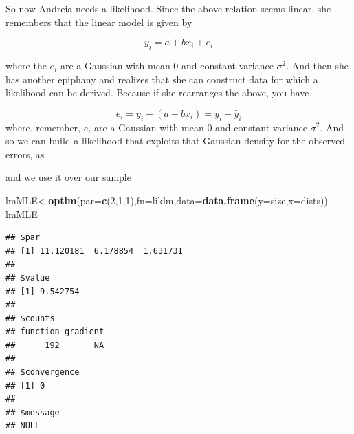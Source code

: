 \documentclass[
]{book}
\newenvironment{Shaded}{\begin{snugshade}}{\end{snugshade}}
\newcommand{\CommentTok}[1]{\textcolor[rgb]{0.56,0.35,0.01}{\textit{#1}}}
\newcommand{\ControlFlowTok}[1]{\textcolor[rgb]{0.13,0.29,0.53}{\textbf{#1}}}
\newcommand{\DataTypeTok}[1]{\textcolor[rgb]{0.13,0.29,0.53}{#1}}
\newcommand{\DecValTok}[1]{\textcolor[rgb]{0.00,0.00,0.81}{#1}}
\newcommand{\KeywordTok}[1]{\textcolor[rgb]{0.13,0.29,0.53}{\textbf{#1}}}
\newcommand{\NormalTok}[1]{#1}
\newcommand{\OperatorTok}[1]{\textcolor[rgb]{0.81,0.36,0.00}{\textbf{#1}}}
\begin{document}
So now Andreia needs a likelihood. Since the above relation seems linear, she remembers that the linear model is given by

\[y_i=a+b x_i+e_i\]

where the \(e_i\) are a Gaussian with mean 0 and constant variance \(\sigma^2\). And then she has another epiphany and realizes that she can construct data for which a likelihood can be derived. Because if she rearranges the above, you have

\[e_i=y_i-(a+b x_i)=y_i-\hat y_i\]
where, remember, \(e_i\) are a Gaussian with mean 0 and constant variance \(\sigma^2\). And so we can build a likelihood that exploits that Gaussian density for the observed errors, as

\begin{Shaded}
\end{Shaded}

and we use it over our sample

\begin{Shaded}
\begin{Highlighting}[]
\NormalTok{lmMLE<-}\KeywordTok{optim}\NormalTok{(}\DataTypeTok{par=}\KeywordTok{c}\NormalTok{(}\DecValTok{2}\NormalTok{,}\DecValTok{1}\NormalTok{,}\DecValTok{1}\NormalTok{),}\DataTypeTok{fn=}\NormalTok{liklm,}\DataTypeTok{data=}\KeywordTok{data.frame}\NormalTok{(}\DataTypeTok{y=}\NormalTok{size,}\DataTypeTok{x=}\NormalTok{dists))}
\NormalTok{lmMLE}
\end{Highlighting}
\end{Shaded}

\begin{verbatim}
## $par
## [1] 11.120181  6.178854  1.631731
## 
## $value
## [1] 9.542754
## 
## $counts
## function gradient 
##      192       NA 
## 
## $convergence
## [1] 0
## 
## $message
## NULL
\end{verbatim}
\end{document}
